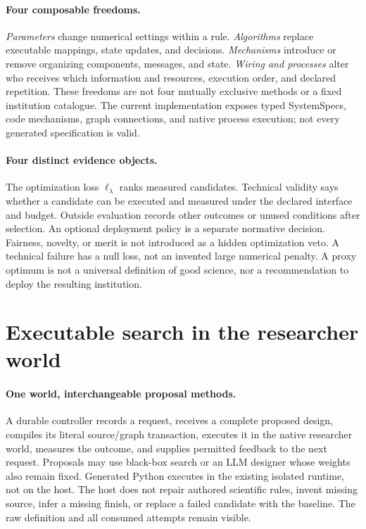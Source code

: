 \documentclass{article}
\begin{document}
\paragraph{Four composable freedoms.}
\emph{Parameters} change numerical settings within a rule.
\emph{Algorithms} replace executable mappings, state updates, and decisions.
\emph{Mechanisms} introduce or remove organizing components, messages, and
state. \emph{Wiring and processes} alter who receives which information and
resources, execution order, and declared repetition. These freedoms are not
four mutually exclusive methods or a fixed institution catalogue. The current
implementation exposes typed SystemSpecs, code mechanisms, graph connections,
and native process execution; not every generated specification is valid.

\paragraph{Four distinct evidence objects.}
The optimization loss $\ell_\lambda$ ranks measured candidates.
Technical validity says whether a candidate can be executed and measured under
the declared interface and budget. Outside evaluation records other outcomes
or unused conditions after selection. An optional deployment policy is a
separate normative decision. Fairness, novelty, or merit is not introduced as a
hidden optimization veto. A technical failure has a null loss, not an invented
large numerical penalty. A proxy optimum is not a universal definition of good
science, nor a recommendation to deploy the resulting institution.

\section{Executable search in the researcher world}
\label{sec:method}
\paragraph{One world, interchangeable proposal methods.}
A durable controller records a request, receives a complete proposed design,
compiles its literal source/graph transaction, executes it in the native
researcher world, measures the outcome, and supplies permitted feedback to the
next request. Proposals may use black-box search or an LLM designer whose
weights also remain fixed. Generated Python executes in the existing isolated
runtime, not on the host. The host does not repair authored scientific rules,
invent missing source, infer a missing finish, or replace a failed candidate
with the baseline. The raw definition and all consumed attempts remain visible.
\end{document}
